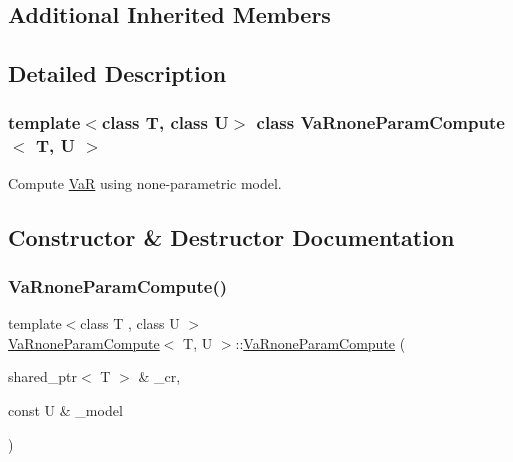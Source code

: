\subsection*{Additional Inherited Members}


\subsection{Detailed Description}
\subsubsection*{template$<$class T, class U$>$\newline
class Va\+Rnone\+Param\+Compute$<$ T, U $>$}

Compute \hyperlink{classVaR}{VaR} using none-\/parametric model. 

\subsection{Constructor \& Destructor Documentation}
\hypertarget{classVaRnoneParamCompute_a777937a68e65b95336aa2b521619f2d9}{}\label{classVaRnoneParamCompute_a777937a68e65b95336aa2b521619f2d9} 
\subsubsection{\texorpdfstring{Va\+Rnone\+Param\+Compute()}{VaRnoneParamCompute()}}
{\footnotesize\ttfamily template$<$class T , class U $>$ \\
\hyperlink{classVaRnoneParamCompute}{Va\+Rnone\+Param\+Compute}$<$ T, U $>$\+::\hyperlink{classVaRnoneParamCompute}{Va\+Rnone\+Param\+Compute} (\begin{DoxyParamCaption}\item[{shared\+\_\+ptr$<$ T $>$ \&}]{\+\_\+cr,  }\item[{const U \&}]{\+\_\+model }\end{DoxyParamCaption})\hspace{0.3cm}{\ttfamily [inline]}}

\hypertarget{classVaRnoneParamCompute_a4b761cc6ae89bf341533dc48e13d63de}{}\label{classVaRnoneParamCompute_a4b761cc6ae89bf341533dc48e13d63de} 
